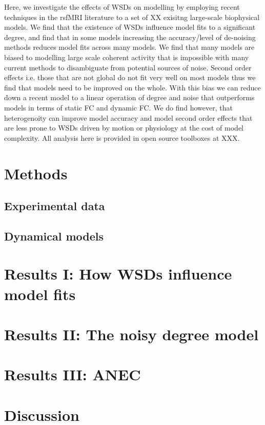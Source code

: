 \documentclass[oneside]{zHenriquesLab-StyleBioRxiv}
\begin{document}
Here, we investigate the effects of WSDs on modelling by employing recent techniques in the rsfMRI literature to a set of XX exisitng large-scale biophysical models. We find that the existence of WSDs influence model fits to a significant degree, and find that in some models increasing the accuracy/level of de-noising methods reduces model fits across many models. We find that many models are biased to modelling large scale coherent activity that is impossible with many current methods to disambiguate from potential sources of noise. Second order effects i.e. those that are not global do not fit very well on most models thus we find that models need to be improved on the whole. With this bias we can reduce down a recent model to a linear operation of degree and noise that outperforms models in terms of static FC and dynamic FC. We do find however, that heterogenoity can improve model accuracy and model second order effects that are less prone to WSDs driven by motion or physiology at the cost of model complexity. All analysis here is provided in open source toolboxes at XXX.

\section*{Methods}
\subsection*{Experimental data}

\subsection*{Dynamical models}

\section*{Results I: How WSDs influence model fits}

\section*{Results II: The noisy degree model}

\section*{Results III: ANEC}

\section*{Discussion}
\end{document}
